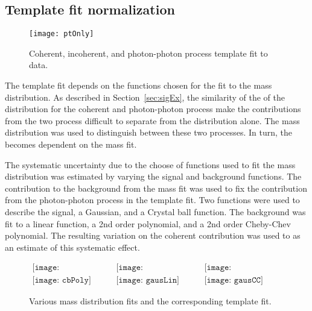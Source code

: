     \subsection{Template fit normalization}
      \begin{figure}[!Hhtb]
        \centering
        \texttt{[image: ptOnly]}
        \caption{Coherent, incoherent, and photon-photon process \pt{} template fit to data.}
        \label{fig:ptTempFit}
      \end{figure}

      The \pt{} template fit depends on the functions chosen for the fit
        to the mass distribution.
      As described in Section~\ref{sec:sigEx}, the similarity of the of the 
        \pt{} distribution for the coherent and photon-photon process make
        the contributions from the two process difficult to separate from the 
        \pt{} distribution alone.
      The mass distribution was used to distinguish between these two processes.
      In turn, the \pt{} becomes dependent on the mass fit. 

      The systematic uncertainty due to the choose of functions used to fit
        the mass distribution was estimated by varying the signal and 
        background functions.
      The contribution to the background from the mass fit was used to fix the
        contribution from the photon-photon process in the \pt{} template
        fit.
      Two functions were used to describe the signal, a Gaussian, and a Crystal
        ball function. 
      The background was fit to a linear function, a 2nd order polynomial, and
        a 2nd order Cheby-Chev polynomial. 
      The resulting variation on the coherent contribution was used to as an
        estimate of this systematic effect. 

      \begin{figure}[!Hhbt]
        \centering
        $ \begin{array}{ccc}
          \texttt{[image: cbPolyBkgEst]} &
          \texttt{[image: gausLinBkgEst]} &
          \texttt{[image: gausCCBkgEst]} \\
          \texttt{[image: cbPoly]} &
          \texttt{[image: gausLin]} &
          \texttt{[image: gausCC]}
        \end{array} $
        \caption{Various mass distribution fits and the corresponding \pt{}
          template fit.}
        \label{fig:massPtFitsForSyst}
      \end{figure}

